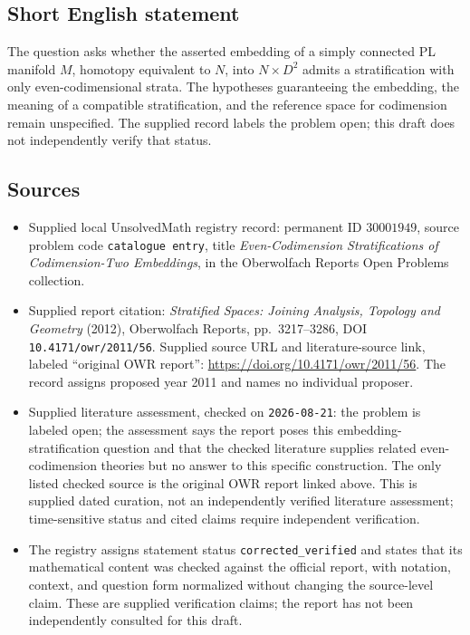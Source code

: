 \documentclass[11pt]{article}
\begin{document}
\subsection{Short English statement}
The question asks whether the asserted embedding of a simply connected PL manifold \(M\), homotopy equivalent to \(N\), into \(N\times D^2\) admits a stratification with only even-codimensional strata. The hypotheses guaranteeing the embedding, the meaning of a compatible stratification, and the reference space for codimension remain unspecified. The supplied record labels the problem open; this draft does not independently verify that status.
\subsection{Sources}
\begin{itemize}
\item Supplied local UnsolvedMath registry record: permanent ID \(30001949\), source problem code \texttt{catalogue entry}, title \emph{Even-Codimension Stratifications of Codimension-Two Embeddings}, in the Oberwolfach Reports Open Problems collection.
\item Supplied report citation: \emph{Stratified Spaces: Joining Analysis, Topology and Geometry} (2012), Oberwolfach Reports, pp.\ 3217--3286, DOI \texttt{10.4171/owr/2011/56}. Supplied source URL and literature-source link, labeled ``original OWR report'': \url{https://doi.org/10.4171/owr/2011/56}. The record assigns proposed year 2011 and names no individual proposer.
\item Supplied literature assessment, checked on \texttt{2026-08-21}: the problem is labeled open; the assessment says the report poses this embedding-stratification question and that the checked literature supplies related even-codimension theories but no answer to this specific construction. The only listed checked source is the original OWR report linked above. This is supplied dated curation, not an independently verified literature assessment; time-sensitive status and cited claims require independent verification.
\item The registry assigns statement status \texttt{corrected\_verified} and states that its mathematical content was checked against the official report, with notation, context, and question form normalized without changing the source-level claim. These are supplied verification claims; the report has not been independently consulted for this draft.
\end{itemize}
\end{document}
